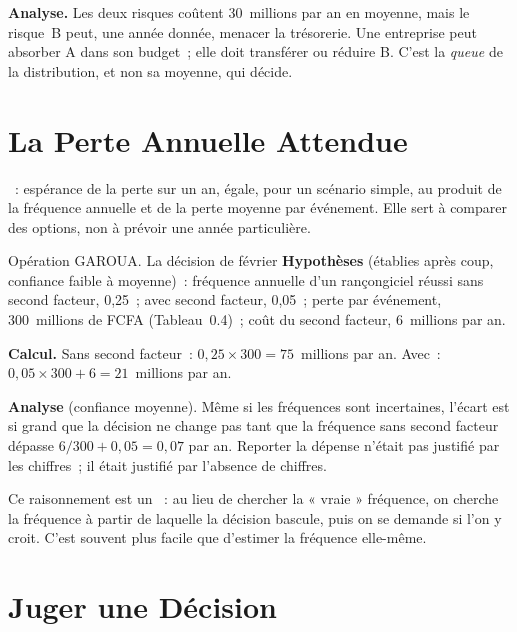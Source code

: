 \textbf{Analyse.} Les deux risques coûtent 30~millions par an en moyenne,
mais le risque~B peut, une année donnée, menacer la trésorerie. Une
entreprise peut absorber A dans son budget~; elle doit transférer ou
réduire B. C'est la \emph{queue} de la distribution, et non sa moyenne,
qui décide.

\section{La Perte Annuelle Attendue}
\label{sec:c01-esperance}

\begin{boxdef}
~: espérance de la perte sur un an,
égale, pour un scénario simple, au produit de la fréquence annuelle et de
la perte moyenne par événement. Elle sert à comparer des options, non à
prévoir une année particulière.
\end{boxdef}

\begin{boxscenario}{Opération GAROUA. La décision de février}
\textbf{Hypothèses} (établies après coup, confiance faible à moyenne)~:
fréquence annuelle d'un rançongiciel réussi sans second facteur, 0,25~;
avec second facteur, 0,05~; perte par événement, 300~millions de FCFA
(Tableau~0.4)~; coût du second facteur, 6~millions par an.

\medskip
\textbf{Calcul.} Sans second facteur~: $0{,}25 \times 300 = 75$~millions
par an. Avec~: $0{,}05 \times 300 + 6 = 21$~millions par an.

\medskip
\textbf{Analyse} (confiance moyenne). Même si les fréquences sont
incertaines, l'écart est si grand que la décision ne change pas tant que
la fréquence sans second facteur dépasse $6/300 + 0{,}05 = 0{,}07$ par an.
Reporter la dépense n'était pas justifié par les chiffres~; il était
justifié par l'absence de chiffres.
\end{boxscenario}

Ce raisonnement est un ~: au lieu de
chercher la « vraie » fréquence, on cherche la fréquence à partir de
laquelle la décision bascule, puis on se demande si l'on y croit. C'est
souvent plus facile que d'estimer la fréquence elle-même.

\section{Juger une Décision}
\label{sec:c01-decision}


